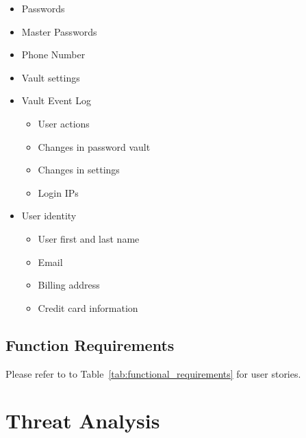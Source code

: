 \documentclass{article}
\begin{document}
\begin{itemize}
  \item Passwords
  \item Master Passwords
  \item Phone Number
  \item Vault settings
  \item Vault Event Log \begin{itemize}
    \item User actions
    \item Changes in password vault
    \item Changes in settings
    \item Login IPs
  \end{itemize}
  \item User identity \begin{itemize}
    \item User first and last name
    \item Email
    \item Billing address
    \item Credit card information
  \end{itemize}
\end{itemize}

\subsection{Function Requirements}
\label{sub:function_requirements}
Please refer to to Table~\ref{tab:functional_requirements} for user stories.

\section{Threat Analysis}
\label{sec:threat_analysis}
\end{document}
